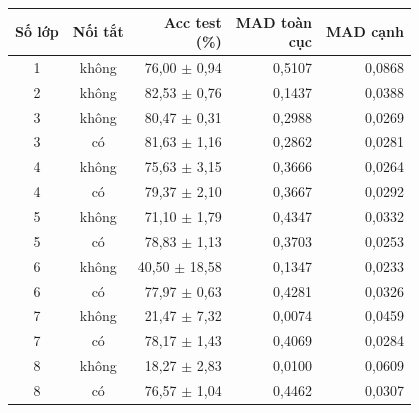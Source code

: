\begin{tabular}{ccrrr}
\toprule
Số lớp & Nối tắt & \makecell[r]{Acc test\\(\%)} & \makecell[r]{MAD toàn\\cục} & MAD cạnh \\
\midrule
1 & không & 76{,}00 $\pm$ 0{,}94 & 0{,}5107 & 0{,}0868 \\
2 & không & 82{,}53 $\pm$ 0{,}76 & 0{,}1437 & 0{,}0388 \\
3 & không & 80{,}47 $\pm$ 0{,}31 & 0{,}2988 & 0{,}0269 \\
3 & có & 81{,}63 $\pm$ 1{,}16 & 0{,}2862 & 0{,}0281 \\
4 & không & 75{,}63 $\pm$ 3{,}15 & 0{,}3666 & 0{,}0264 \\
4 & có & 79{,}37 $\pm$ 2{,}10 & 0{,}3667 & 0{,}0292 \\
5 & không & 71{,}10 $\pm$ 1{,}79 & 0{,}4347 & 0{,}0332 \\
5 & có & 78{,}83 $\pm$ 1{,}13 & 0{,}3703 & 0{,}0253 \\
6 & không & 40{,}50 $\pm$ 18{,}58 & 0{,}1347 & 0{,}0233 \\
6 & có & 77{,}97 $\pm$ 0{,}63 & 0{,}4281 & 0{,}0326 \\
7 & không & 21{,}47 $\pm$ 7{,}32 & 0{,}0074 & 0{,}0459 \\
7 & có & 78{,}17 $\pm$ 1{,}43 & 0{,}4069 & 0{,}0284 \\
8 & không & 18{,}27 $\pm$ 2{,}83 & 0{,}0100 & 0{,}0609 \\
8 & có & 76{,}57 $\pm$ 1{,}04 & 0{,}4462 & 0{,}0307 \\
\bottomrule
\end{tabular}
